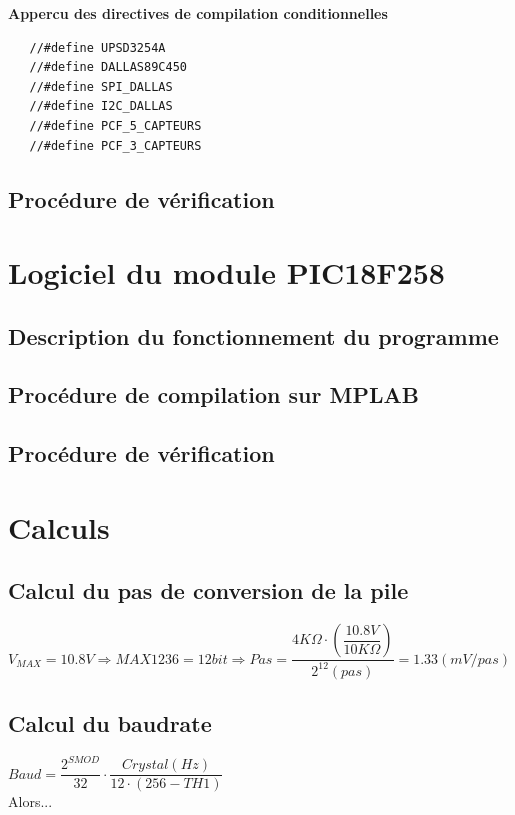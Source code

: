 \documentclass[10pt,a4paper,final]{article}
\begin{document}
\textbf{Appercu des directives de compilation conditionnelles}
\begin{lstlisting}
   //#define UPSD3254A
   //#define DALLAS89C450
   //#define SPI_DALLAS
   //#define I2C_DALLAS
   //#define PCF_5_CAPTEURS
   //#define PCF_3_CAPTEURS
\end{lstlisting}
\begin{spacing}{1.5}
\subsection{Procédure de vérification}


\section{Logiciel du module PIC18F258}
\subsection{Description du fonctionnement du programme}

\subsection{Procédure de compilation sur MPLAB}

\subsection{Procédure de vérification}

\pagebreak
\section{Calculs}
\subsection{Calcul du pas de conversion de la pile}
$V_{MAX}=10.8V \Rightarrow MAX1236  = 12 bit \Rightarrow Pas = \dfrac{4K\Omega \cdot \left(\dfrac{10.8V}{10K\Omega}\right)}{2^{12}(pas)} = 1.33(mV/pas)$
\subsection{Calcul du baudrate}
$Baud = \dfrac{2^{SMOD}}{32}\cdot\dfrac{Crystal (Hz)}{12\cdot(256 - TH1)}$\\


Alors...\\



\end{spacing}
\end{document}
